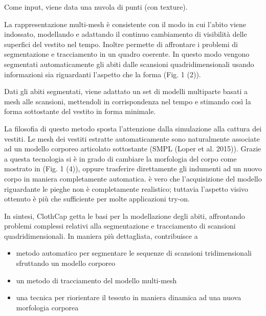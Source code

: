 \medskip

Come input, viene data una nuvola di punti (con texture).

\medskip

La rappresentazione multi-mesh è consistente con il modo in cui l’abito viene indossato, modellando e adattando il continuo cambiamento di visibilità delle superfici del vestito nel tempo.
Inoltre permette di affrontare i problemi di segmentazione e tracciamento in un quadro coerente. In questo modo vengono segmentati automaticamente gli abiti dalle scansioni quadridimensionali usando informazioni sia riguardanti l’aspetto che la forma (Fig. 1 (2)). %


\medskip

Dati gli abiti segmentati, viene adattato un set di modelli multiparte basati a mesh alle scansioni, mettendoli in corrispondenza nel tempo e stimando così la forma sottostante del vestito in forma minimale.

\medskip

La filosofia di questo metodo sposta l’attenzione dalla simulazione alla cattura dei vestiti.
Le mesh dei vestiti estratte automaticamente sono naturalmente associate ad un modello corporeo articolato sottostante (SMPL (Loper et al. 2015)).
Grazie a questa tecnologia si è in grado di cambiare la morfologia del corpo come mostrato in (Fig. 1 (4)), oppure trasferire direttamente gli indumenti ad un nuovo corpo in maniera completamente automatica.
è vero che l’acquisizione del modello riguardante le pieghe non è completamente realistico; tuttavia l’aspetto visivo ottenuto è più che sufficiente per molte applicazioni try-on.


\medskip

In sintesi, ClothCap getta le basi per la modellazione degli abiti, affrontando problemi complessi relativi alla segmentazione e tracciamento di scansioni quadridimensionali.
In maniera più dettagliata, contribuisce a 
\begin{itemize}
\item metodo automatico per segmentare le sequenze di scansioni tridimensionali sfruttando un modello corporeo
\item un metodo di tracciamento del modello multi-mesh
\item una tecnica per riorientare il tessuto in maniera dinamica ad una nuova morfologia corporea
\end{itemize}


